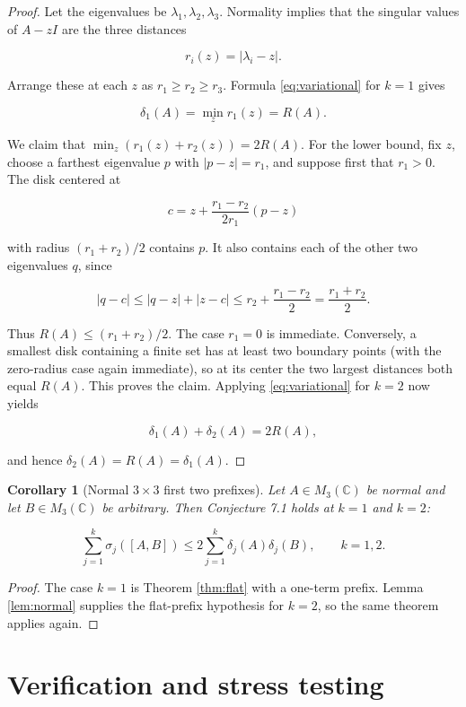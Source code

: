 \documentclass[11pt]{article}
\newtheorem{corollary}{Corollary}
\newcommand{\C}{\mathbb C}
\newcommand{\M}{M}
\begin{document}
\begin{proof}
Let the eigenvalues be \(\lambda_1,\lambda_2,\lambda_3\).  Normality implies
that the singular values of \(A-zI\) are the three distances

\[
 r_i(z)=|\lambda_i-z|.
\]

Arrange these at each \(z\) as \(r_1\geq r_2\geq r_3\).  Formula
\eqref{eq:variational} for \(k=1\) gives

\[
 \delta_1(A)=\min_z r_1(z)=R(A).
\]

We claim that \(\min_z(r_1(z)+r_2(z))=2R(A)\).  For the lower bound, fix
\(z\), choose a farthest eigenvalue \(p\) with \(|p-z|=r_1\), and suppose
first that \(r_1>0\).  The disk centered at

\[
 c=z+\frac{r_1-r_2}{2r_1}(p-z)
\]

with radius \((r_1+r_2)/2\) contains \(p\).  It also contains each of the
other two eigenvalues \(q\), since

\[
 |q-c|\leq |q-z|+|z-c|
 \leq r_2+\frac{r_1-r_2}{2}
 =\frac{r_1+r_2}{2}.
\]

Thus \(R(A)\leq(r_1+r_2)/2\).  The case \(r_1=0\) is immediate.  Conversely,
a smallest disk containing a finite set has at least two boundary points
(with the zero-radius case again immediate), so at its center the two largest
distances both equal \(R(A)\).  This proves the claim.  Applying
\eqref{eq:variational} for \(k=2\) now yields

\[
 \delta_1(A)+\delta_2(A)=2R(A),
\]

and hence \(\delta_2(A)=R(A)=\delta_1(A)\).
\end{proof}

\begin{corollary}[Normal \(3\times3\) first two prefixes]
\label{cor:normal}
Let \(A\in\M_3(\C)\) be normal and let \(B\in\M_3(\C)\) be arbitrary.  Then
Conjecture 7.1 holds at \(k=1\) and \(k=2\):

\[
 \sum_{j=1}^k\sigma_j([A,B])
 \leq 2\sum_{j=1}^k\delta_j(A)\delta_j(B),
 \qquad k=1,2.
\]
\end{corollary}

\begin{proof}
The case \(k=1\) is Theorem \ref{thm:flat} with a one-term prefix.  Lemma
\ref{lem:normal} supplies the flat-prefix hypothesis for \(k=2\), so the same
theorem applies again.
\end{proof}

\section*{Verification and stress testing}
\end{document}
